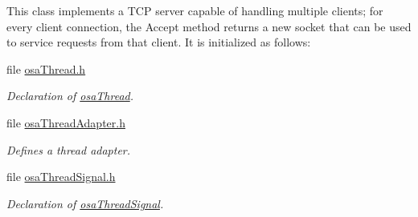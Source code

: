 \begin{DoxyCompactItemize}
\begin{DoxyCompactList}
This class implements a T\-C\-P server capable of handling multiple clients; for every client connection, the Accept method returns a new socket that can be used to service requests from that client. It is initialized as follows\-: \end{DoxyCompactList}\item 
file \hyperlink{osa_thread_8h}{osa\-Thread.\-h}
\begin{DoxyCompactList}\small\item\em Declaration of \hyperlink{classosa_thread}{osa\-Thread}. \end{DoxyCompactList}\item 
file \hyperlink{osa_thread_adapter_8h}{osa\-Thread\-Adapter.\-h}
\begin{DoxyCompactList}\small\item\em Defines a thread adapter. \end{DoxyCompactList}\item 
file \hyperlink{osa_thread_signal_8h}{osa\-Thread\-Signal.\-h}
\begin{DoxyCompactList}\small\item\em Declaration of \hyperlink{classosa_thread_signal}{osa\-Thread\-Signal}. \end{DoxyCompactList}\end{DoxyCompactItemize}
